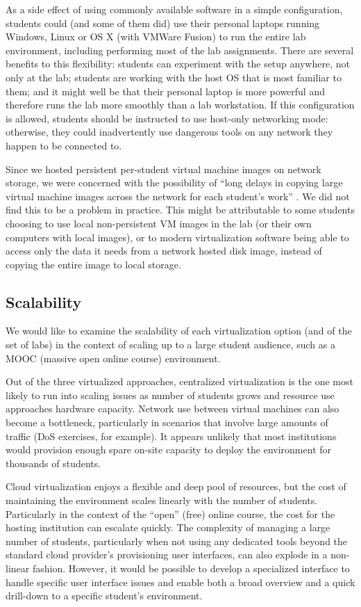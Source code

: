 \documentclass{sig-alternate-2013}
\begin{document}
As a side effect of using commonly available software in a simple configuration, students could (and some of them did) 
use their personal laptops running Windows, Linux or OS X (with VMWare Fusion) to run the entire lab environment, 
including performing most of the lab assignments. There are several benefits to this flexibility: students can experiment
with the setup anywhere, not only at the lab; students are working with the host OS that is most familiar to them;
and it might well be that their personal laptop is more powerful and therefore runs the lab more smoothly than a lab
workstation. If this configuration is allowed, students should be instructed to use host-only networking mode: otherwise,
they could inadvertently use dangerous tools on any network they happen to be connected to.

Since we hosted persistent per-student virtual machine images on network storage, we were concerned 
with the possibility of ``long delays in copying large virtual machine images across the network for each student's work''  \cite{virtplatform}. 
We did not find this to be a problem in practice. This might be attributable to some students choosing to use 
local non-persistent VM images in the lab (or their own computers with local images), 
or to modern virtualization software being able to access only the data it needs
from a network hosted disk image, instead of copying the entire image to local storage.

\subsection{Scalability}

We would like to examine the scalability of each virtualization option (and of the set of labs) in the context of scaling up
to a large student audience, such as a MOOC (massive open online course) environment.

Out of the three virtualized approaches, centralized virtualization is the one most likely to run into scaling issues
as number of students grows and resource use approaches hardware capacity. Network use between virtual machines can
also become a bottleneck, particularly in scenarios that involve large amounts of traffic (DoS exercises, for example). It 
appears unlikely that most institutions would provision enough spare on-site capacity to deploy the environment 
for thousands of students.

Cloud virtualization enjoys a flexible and deep pool of resources, but the cost of maintaining the environment scales 
linearly with the number of students. Particularly in the context of the ``open'' (free) online course, the cost for the hosting
institution can escalate quickly. The complexity of managing a large number of students, particularly when not using any
dedicated tools beyond the standard cloud provider's provisioning user interfaces, can also explode in a non-linear fashion.
However, it would be possible to develop a specialized interface to handle specific user interface issues and enable both
a broad overview and a quick drill-down to a specific student's environment.
\end{document}
